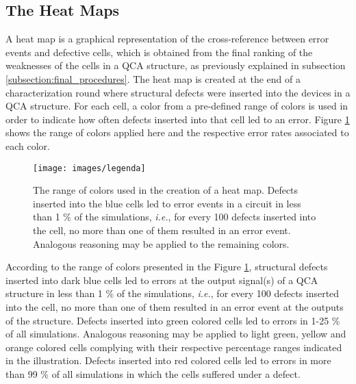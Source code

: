 \subsection{The Heat Maps}
\label{subsection:the_heat_maps}

A heat map is a graphical representation of the cross-reference between error events and defective cells, which is obtained from the final ranking of the weaknesses of the cells in a QCA structure, as previously explained in subsection \ref{subsection:final_procedures}. The heat map is created at the end of a characterization round where structural defects were inserted into the devices in a QCA structure. For each cell, a color from a pre-defined range of colors is used in order to indicate how often defects inserted into that cell led to an error. Figure \ref{figure:heatmap_caption} shows the range of colors applied here and the respective error rates associated to each color.

\begin{figure}[H]
\center
\texttt{[image: images/legenda]}
\caption{The range of colors used in the creation of a heat map. Defects inserted into the blue cells led to error events in a circuit in less than 1 \% of the simulations, \textit{i.e.}, for every 100 defects inserted into the cell, no more than one of them resulted in an error event. Analogous reasoning may be applied to the remaining colors.}
\label{figure:heatmap_caption}
\end{figure}

According to the range of colors presented in the Figure \ref{figure:heatmap_caption}, structural defects inserted into dark blue cells led to errors at the output signal(s) of a QCA structure in less than 1 \% of the simulations, \textit{i.e.}, for every 100 defects inserted into the cell, no more than one of them resulted in an error event at the outputs of the structure. Defects inserted into green colored cells led to errors in 1-25 \% of all simulations. Analogous reasoning may be applied to light green, yellow and orange colored cells complying with their respective percentage ranges indicated in the illustration. Defects inserted into red colored cells led to errors in more than 99 \% of all simulations in which the cells suffered under a defect.

